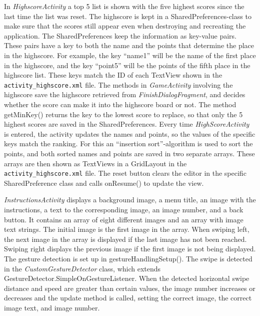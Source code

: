 In \emph{HighscoreActivity} a top 5 list is shown with the five highest scores since the last time the list was reset. The highscore is kept in a SharedPreferences-class to make sure that the scores still appear even when destroying and recreating the application. The SharedPreferences keep the information as key-value pairs. These pairs have a key to both the name and the points that determine the place in the highscore. For example, the key “name1” will be the name of the first place in the highscore, and the key “point5” will be the points of the fifth place in the highscore list. These keys match the ID of each TextView shown in the \verb|activity_highscore.xml| file. The methods in \emph{GameActivity} involving the highscore save the highscore retrieved from \emph{FinishDialogFragment}, and decides whether the score can make it into the highscore board or not. The method getMinKey() returns the key to the lowest score to replace, so that only the 5 highest scores are saved in the SharedPreferences. 
Every time \emph{HighScoreActivity} is entered, the activity updates the names and points, so the values of the specific keys match the ranking. For this an “insertion sort”-algorithm is used to sort the points, and both sorted names and points are saved in two separate arrays. These arrays are then shown as TextViews in a GridLayout in the \verb|activity_highscore.xml| file.
The reset button clears the editor in the specific SharedPreference class and calls onResume() to update the view.  \newline

\emph{InstructionsActivity} displays a background image, a menu title, an image with the instructions, a text to the corresponding image, an image number, and a back button. It contains an array of eight different images and an array with image text strings. The initial image is the first image in the array. When swiping left, the next image in the array is displayed if the last image has not been reached. Swiping right displays the previous image if the first image is not being displayed. The gesture detection is set up in gestureHandlingSetup(). The swipe is detected in the \emph{CustomGestureDetector} class, which extends GestureDetector.SimpleOnGestureListener. When the detected horizontal swipe distance and speed are greater than certain values, the image number increases or decreases and the update method is called, setting the correct image, the correct image text, and image number. \newline

